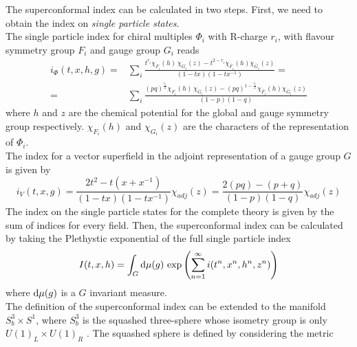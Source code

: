 The superconformal index can be calculated in two steps.
First, we need to obtain the index on \emph{single particle states}.\\
The single particle index for chiral multiples $\Phi_i$ with R-charge $r_i$, with flavour symmetry group $F_i$ and gauge group $G_i$ reads \cite{Dolan:2008qi}
\begin{align}
i_{\Phi}(t,x,h,g) =&  \sum_{i} \frac{ t^{r_i} \chi_{F_i}(h) \, \chi_{G_i}(z) - t^{2-r_i} \chi_{\bar{F}_i}(h) \chi_{\bar{G}_i}(z)}{ (1-tx) (1- t x^{-1})} = \\
=& \sum_{i} \frac{ (pq)^{\frac{r_i}{2}} \chi_{F_i}(h) \, \chi_{G_i}(z) - (pq)^{1-\frac{r_i}{2}} \chi_{\bar{F}_i}(h) \chi_{\bar{G}_i}(z)}{ (1-p) (1- q)} 
\label{eqn:superconforma_index_chiral}
\end{align}
where $h$ and $z$ are the chemical potential for the global and gauge symmetry group respectively. $\chi_{F_i}(h)$ and $\chi_{G_i}(z)$ are the characters of the representation of $\Phi_i$.\\
The index for a vector superfield in the adjoint representation of a gauge group $G$ is given by \cite{Dolan:2008qi}
\begin{equation}
i_{V} (t,x,g) = \frac{2 t^2 - t(x + x^{-1})}{(1-tx) (1 - tx^{-1})} \chi_{adj}(z) =  \frac{2 (pq) - (p+q )}{(1-p) (1 - q)} \chi_{adj}(z)
\label{eqn:superconformal_index_vector}
\end{equation}
The index on the single particle states for the complete theory is given by the sum of indices for every field. 
Then, the superconformal index can be calculated by taking the Plethystic exponential \cite{Feng:2007ur} of the full single particle index
\begin{equation}
  I(t,x,h) = \int_{G} \hbox{d} \mu(g)\,  \exp{ \left(  \sum_{n=1}^{\infty}i(t^n,x^n,h^n,z^n) \right)}
  \end{equation}  
where $\hbox{d} \mu(g)$ is a $G$ invariant measure.\\
The definition of the superconformal index can be extended to the manifold $S_b^3 \times S^1$, where $S_b^3$ is the squashed three-sphere whose isometry group is only $U(1)_L \times U(1)_R$ \cite{Hama:2011ea}.
The squashed sphere is defined by considering the metric 
